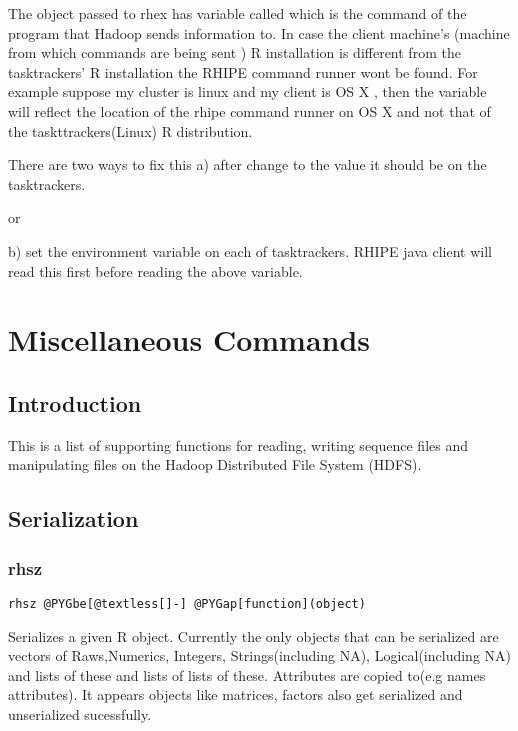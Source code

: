 \documentclass[letterpaper,10pt,english]{manual}
\begin{document}
The object passed to rhex has variable called  which is the
command of the program that Hadoop sends information to. In case the client
machine's (machine from which commands are being sent ) R installation is different from the
tasktrackers' R installation the RHIPE command runner wont be found. For example
suppose my cluster is linux and my client is OS X , then the 
variable will reflect the location of the rhipe command runner on OS X and not
that of the taskttrackers(Linux) R distribution.

There are two ways to fix this
a) after  change  to the
value it should be on the tasktrackers.

or

b) set the environment variable  on each of tasktrackers. RHIPE
java client will read this first before reading the above variable.

\resetcurrentobjects
\hypertarget{--doc-rhmisc}{}

\chapter{Miscellaneous Commands}


\section{Introduction}

This is a list of supporting functions for reading, writing sequence files and
manipulating files on the Hadoop Distributed File System (HDFS).


\section{Serialization}


\subsection{rhsz}

\begin{Verbatim}[commandchars=@\[\]]
rhsz @PYGbe[@textless[]-] @PYGap[function](object)
\end{Verbatim}

Serializes a given R object. Currently the only objects that can be serialized
are vectors of Raws,Numerics, Integers, Strings(including NA), Logical(including NA)
and lists of these and lists of lists of these. Attributes are copied to(e.g
names attributes). It appears objects like matrices, factors also get serialized
and unserialized sucessfully.
\end{document}
